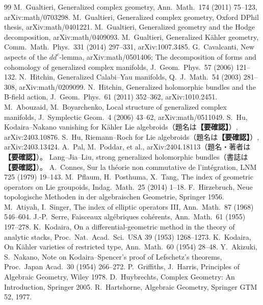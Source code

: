 \documentclass[11pt,a4paper]{article}
\theoremstyle{definition}
\newcommand{\chk}{\textcolor{orange!80!black}{\textbf{【要確認】}}}
\begin{document}
\begin{thebibliography}{99}\small
{} M.\ Gualtieri, Generalized complex geometry, Ann.\ Math.\ 174 (2011) 75--123, arXiv:math/0703298.
 M.\ Gualtieri, Generalized complex geometry, Oxford DPhil thesis, arXiv:math/0401221.
 M.\ Gualtieri, Generalized geometry and the Hodge decomposition, arXiv:math/0409093.
 M.\ Gualtieri, Generalized K\"ahler geometry, Comm.\ Math.\ Phys.\ 331 (2014) 297--331, arXiv:1007.3485.
 G.\ Cavalcanti, New aspects of the $dd^c$-lemma, arXiv:math/0501406; The decomposition of forms and cohomology of generalized complex manifolds, J.\ Geom.\ Phys.\ 57 (2006) 121--132.
 N.\ Hitchin, Generalized Calabi--Yau manifolds, Q.\ J.\ Math.\ 54 (2003) 281--308, arXiv:math/0209099.
 N.\ Hitchin, Generalized holomorphic bundles and the B-field action, J.\ Geom.\ Phys.\ 61 (2011) 352--362, arXiv:1010.2451.
 M.\ Abouzaid, M.\ Boyarchenko, Local structure of generalized complex manifolds, J.\ Symplectic Geom.\ 4 (2006) 43--62, arXiv:math/0511049.
 S.\ Hu, Kodaira--Nakano vanishing for Kähler Lie algebroids（題名は\chk）, arXiv:2403.10876.
 S.\ Hu, Riemann--Roch for Lie algebroids（題名は\chk）, arXiv:2403.13424.
 A.\ Pal, M.\ Poddar, et al., arXiv:2404.18113（題名・著者は\chk）。
 Lang--Jia--Liu, strong generalized holomorphic bundles（書誌は\chk）。
 A.\ Connes, Sur la th\'eorie non commutative de l'int\'egration, LNM 725 (1979) 19--143.
 M.\ Pflaum, H.\ Posthuma, X.\ Tang, The index of geometric operators on Lie groupoids, Indag.\ Math.\ 25 (2014) 1--18.
 F.\ Hirzebruch, Neue topologische Methoden in der algebraischen Geometrie, Springer 1956.
 M.\ Atiyah, I.\ Singer, The index of elliptic operators III, Ann.\ Math.\ 87 (1968) 546--604.
 J.-P.\ Serre, Faisceaux alg\'ebriques coh\'erents, Ann.\ Math.\ 61 (1955) 197--278.
 K.\ Kodaira, On a differential-geometric method in the theory of analytic stacks, Proc.\ Nat.\ Acad.\ Sci.\ USA 39 (1953) 1268--1273.
 K.\ Kodaira, On K\"ahler varieties of restricted type, Ann.\ Math.\ 60 (1954) 28--48.
 Y.\ Akizuki, S.\ Nakano, Note on Kodaira--Spencer's proof of Lefschetz's theorems, Proc.\ Japan Acad.\ 30 (1954) 266--272.
 P.\ Griffiths, J.\ Harris, Principles of Algebraic Geometry, Wiley 1978.
 D.\ Huybrechts, Complex Geometry: An Introduction, Springer 2005.
 R.\ Hartshorne, Algebraic Geometry, Springer GTM 52, 1977.
\end{thebibliography}
\end{document}
